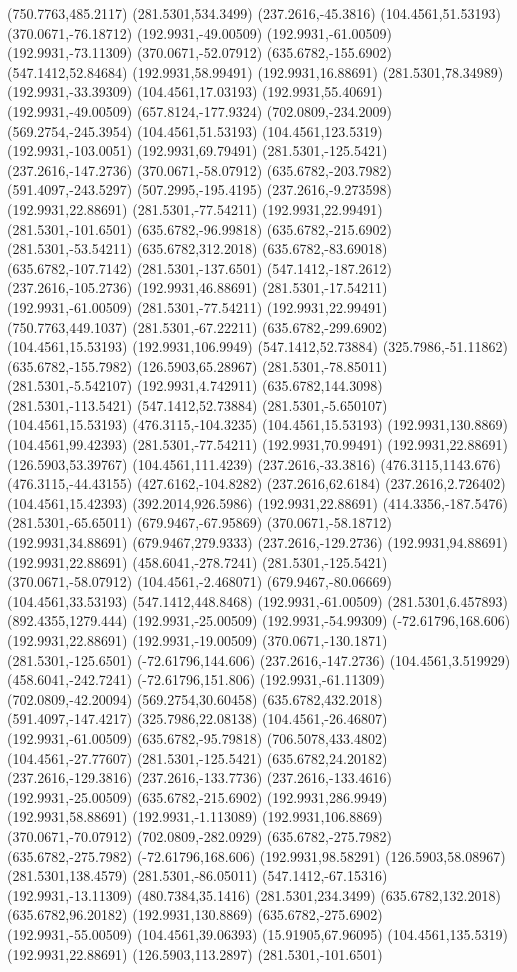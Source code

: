 \documentclass[12pt,letterpaper]{article}
\begin{document}
(750.7763,485.2117) (281.5301,534.3499) (237.2616,-45.3816) (104.4561,51.53193) (370.0671,-76.18712) (192.9931,-49.00509) (192.9931,-61.00509) (192.9931,-73.11309) (370.0671,-52.07912) (635.6782,-155.6902) (547.1412,52.84684) (192.9931,58.99491) (192.9931,16.88691) (281.5301,78.34989) (192.9931,-33.39309) (104.4561,17.03193) (192.9931,55.40691) (192.9931,-49.00509) (657.8124,-177.9324) (702.0809,-234.2009) (569.2754,-245.3954) (104.4561,51.53193) (104.4561,123.5319) (192.9931,-103.0051) (192.9931,69.79491) (281.5301,-125.5421) (237.2616,-147.2736) (370.0671,-58.07912) (635.6782,-203.7982) (591.4097,-243.5297) (507.2995,-195.4195) (237.2616,-9.273598) (192.9931,22.88691) (281.5301,-77.54211) (192.9931,22.99491) (281.5301,-101.6501) (635.6782,-96.99818) (635.6782,-215.6902) (281.5301,-53.54211) (635.6782,312.2018) (635.6782,-83.69018) (635.6782,-107.7142) (281.5301,-137.6501) (547.1412,-187.2612) (237.2616,-105.2736) (192.9931,46.88691) (281.5301,-17.54211) (192.9931,-61.00509) (281.5301,-77.54211) (192.9931,22.99491) (750.7763,449.1037) (281.5301,-67.22211) (635.6782,-299.6902) (104.4561,15.53193) (192.9931,106.9949) (547.1412,52.73884) (325.7986,-51.11862) (635.6782,-155.7982) (126.5903,65.28967) (281.5301,-78.85011) (281.5301,-5.542107) (192.9931,4.742911) (635.6782,144.3098) (281.5301,-113.5421) (547.1412,52.73884) (281.5301,-5.650107) (104.4561,15.53193) (476.3115,-104.3235) (104.4561,15.53193) (192.9931,130.8869) (104.4561,99.42393) (281.5301,-77.54211) (192.9931,70.99491) (192.9931,22.88691) (126.5903,53.39767) (104.4561,111.4239) (237.2616,-33.3816) (476.3115,1143.676) (476.3115,-44.43155) (427.6162,-104.8282) (237.2616,62.6184) (237.2616,2.726402) (104.4561,15.42393) (392.2014,926.5986) (192.9931,22.88691) (414.3356,-187.5476) (281.5301,-65.65011) (679.9467,-67.95869) (370.0671,-58.18712) (192.9931,34.88691) (679.9467,279.9333) (237.2616,-129.2736) (192.9931,94.88691) (192.9931,22.88691) (458.6041,-278.7241) (281.5301,-125.5421) (370.0671,-58.07912) (104.4561,-2.468071) (679.9467,-80.06669) (104.4561,33.53193) (547.1412,448.8468) (192.9931,-61.00509) (281.5301,6.457893) (892.4355,1279.444) (192.9931,-25.00509) (192.9931,-54.99309) (-72.61796,168.606) (192.9931,22.88691) (192.9931,-19.00509) (370.0671,-130.1871) (281.5301,-125.6501) (-72.61796,144.606) (237.2616,-147.2736) (104.4561,3.519929) (458.6041,-242.7241) (-72.61796,151.806) (192.9931,-61.11309) (702.0809,-42.20094) (569.2754,30.60458) (635.6782,432.2018) (591.4097,-147.4217) (325.7986,22.08138) (104.4561,-26.46807) (192.9931,-61.00509) (635.6782,-95.79818) (706.5078,433.4802) (104.4561,-27.77607) (281.5301,-125.5421) (635.6782,24.20182) (237.2616,-129.3816) (237.2616,-133.7736) (237.2616,-133.4616) (192.9931,-25.00509) (635.6782,-215.6902) (192.9931,286.9949) (192.9931,58.88691) (192.9931,-1.113089) (192.9931,106.8869) (370.0671,-70.07912) (702.0809,-282.0929) (635.6782,-275.7982) (635.6782,-275.7982) (-72.61796,168.606) (192.9931,98.58291) (126.5903,58.08967) (281.5301,138.4579) (281.5301,-86.05011) (547.1412,-67.15316) (192.9931,-13.11309) (480.7384,35.1416) (281.5301,234.3499) (635.6782,132.2018) (635.6782,96.20182) (192.9931,130.8869) (635.6782,-275.6902) (192.9931,-55.00509) (104.4561,39.06393) (15.91905,67.96095) (104.4561,135.5319) (192.9931,22.88691) (126.5903,113.2897) (281.5301,-101.6501) 
\end{document}

